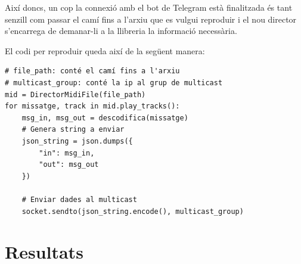 \documentclass[a4paper]{paper}
\let\oldsection\section
\renewcommand\section{\clearpage\oldsection}
\begin{document}
Així doncs, un cop la connexió amb el bot de Telegram està finalitzada és tant senzill com passar el camí fins a l'arxiu que es vulgui reproduir i el nou director s'encarrega de demanar-li a la llibreria la informació necessària.

El codi per reproduir queda així de la següent manera:
\begin{lstlisting}[style=mypython]
# file_path: conté el camí fins a l'arxiu
# multicast_group: conté la ip al grup de multicast
mid = DirectorMidiFile(file_path)
for missatge, track in mid.play_tracks():
	msg_in, msg_out = descodifica(missatge)
	# Genera string a enviar
	json_string = json.dumps({
		"in": msg_in,
		"out": msg_out
	})
	
	# Enviar dades al multicast
	socket.sendto(json_string.encode(), multicast_group)
\end{lstlisting}


\section{Resultats}



\printbibliography
\end{document}
